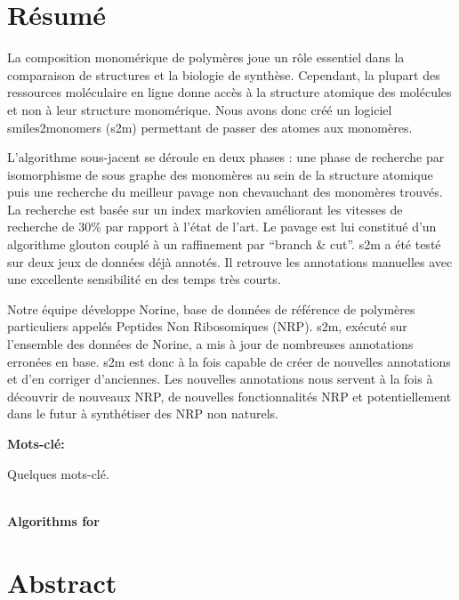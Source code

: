 \documentclass[12pt]{LHSV_thesis}
\begin{document}
\section*{\Huge Résumé}
%

La composition monomérique de polymères joue un rôle essentiel dans la comparaison de structures et la biologie de synthèse.
Cependant, la plupart des ressources moléculaire en ligne donne accès à la structure atomique des molécules et non à leur structure monomérique.
Nous avons donc créé un logiciel smiles2monomers (s2m) permettant de passer des atomes aux monomères.

L'algorithme sous-jacent se déroule en deux phases : une phase de recherche par isomorphisme de sous graphe des monomères au sein de la structure atomique puis une recherche du meilleur pavage non chevauchant des monomères trouvés.
La recherche est basée sur un index markovien améliorant les vitesses de recherche de 30\% par rapport à l'état de l'art.
Le pavage est lui constitué d'un algorithme glouton couplé à un raffinement par ``branch \& cut''.
s2m a été testé sur deux jeux de données déjà annotés.
Il retrouve les annotations manuelles avec une excellente sensibilité en des temps très courts.

Notre équipe développe Norine, base de données de référence de polymères particuliers appelés Peptides Non Ribosomiques (NRP).
s2m, exécuté sur l'ensemble des données de Norine, a mis à jour de nombreuses annotations erronées en base.
s2m est donc à la fois capable de créer de nouvelles annotations et d'en corriger d'anciennes.
Les nouvelles annotations nous servent à la fois à découvrir de nouveaux NRP, de nouvelles fonctionnalités NRP et potentiellement dans le futur à synthétiser des NRP non naturels.


\vspace*{28pt}\par
\textbf{Mots-clé:}\par
Quelques mots-clé.
\par
\clearpage

\begin{center}
~\vspace{6.0cm}\\
\thispagestyle{plain}
\Huge \textbf{Algorithms for }
\vspace*{\fill}
\clearpage
\end{center}

\section*{\Huge Abstract}
%
\vspace{2cm}
\end{document}

